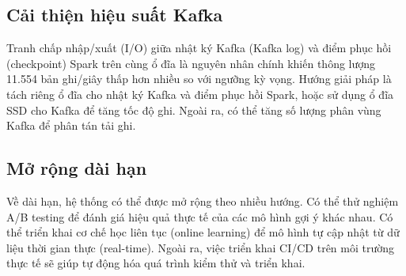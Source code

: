 \documentclass[../BTL.tex]{subfiles}
\begin{document}
\subsection{Cải thiện hiệu suất Kafka}
Tranh chấp nhập/xuất (I/O) giữa nhật ký Kafka (Kafka log) và điểm phục hồi (checkpoint) Spark trên cùng ổ đĩa là nguyên nhân chính khiến thông lượng 11.554 bản ghi/giây thấp hơn nhiều so với ngưỡng kỳ vọng. Hướng giải pháp là tách riêng ổ đĩa cho nhật ký Kafka và điểm phục hồi Spark, hoặc sử dụng ổ đĩa SSD cho Kafka để tăng tốc độ ghi. Ngoài ra, có thể tăng số lượng phân vùng Kafka để phân tán tải ghi.

\subsection{Mở rộng dài hạn}
Về dài hạn, hệ thống có thể được mở rộng theo nhiều hướng. Có thể thử nghiệm A/B testing để đánh giá hiệu quả thực tế của các mô hình gợi ý khác nhau. Có thể triển khai cơ chế học liên tục (online learning) để mô hình tự cập nhật từ dữ liệu thời gian thực (real-time). Ngoài ra, việc triển khai CI/CD trên môi trường thực tế sẽ giúp tự động hóa quá trình kiểm thử và triển khai.
\end{document}
